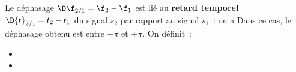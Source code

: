 \documentclass[../../main/main.tex]{subfiles}
\begin{document}
\noindent
\begin{minipage}{0.65\linewidth}
	Le déphasage $\D\f_{2/1} = \f_2 - \f_1$ est lié au \textbf{retard temporel}
	$\D{t}_{2/1} = t_2 - t_1$ du signal $s_2$ par rapport au signal $s_1$~: on a
	\psw{%
		\[\boxed{\abs{\D\f_{2/1}} = \w \abs{\D{t}_{2/1}}}\]
	}%
	Dans ce cas, le déphasage obtenu est entre $-\pi$ et $+\pi$. On définit~:
	\begin{itemize}
		\item {}%
		\item {}%
	\end{itemize}
\end{minipage}
\hfill
\begin{minipage}{0.30\linewidth}
	\vspace{-15pt}
	\begin{center}
	\end{center}
\end{minipage}
\end{document}
